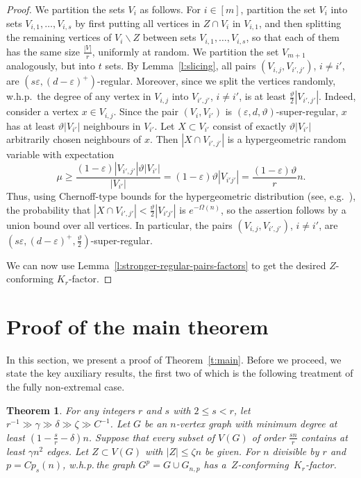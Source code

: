 \documentclass[reqno, 12pt]{amsart}
\numberwithin{equation}{section}
\numberwithin{figure}{section}
\theoremstyle{plain}
\newtheorem{thm}{Theorem}[section]
\theoremstyle{definition}
\let\eps=\varepsilon
\def \Gnp{G_{n,p}}
\let\setminus=\smallsetminus
\begin{document}
    \begin{proof}
        We partition the sets $V_i$ as follows. For $i\in[m]$, partition the set $V_i$ into sets $V_{i,1},\dots,V_{i,s}$ by first putting all vertices in $Z\cap V_i$ in $V_{i,1}$, and then splitting the remaining vertices of $V_i\setminus Z$ between sets $V_{i,1},\dots,V_{i,s}$, so that each of them has the same size $\frac{|V|}{r}$, uniformly at random. We partition the set $V_{m+1}$ analogously, but into $t$ sets. By Lemma~\ref{l:slicing}, all pairs $(V_{i,j}, V_{i',j'})$, $i\neq i
        '$, are $(s\eps,(d-\eps)^+)$-regular. Moreover, since we split the vertices randomly, w.h.p.~the degree of any vertex in $V_{i,j}$ into $V_{i',j'}$, $i\neq i'$, is at least $\frac{\vartheta}{2}|V_{i',j'}|$. Indeed, consider a vertex $x\in V_{i,j}$. Since the pair $(V_i, V_{i'})$ is $(\eps,d,\vartheta)$-super-regular, $x$ has at least $\vartheta|V_{i'}|$ neighbours in $V_{i'}$. Let $X\subset V_{i'}$ consist of exactly $\vartheta|V_{i'}|$ arbitrarily chosen neighbours of $x$. Then $|X\cap V_{i',j'}|$ is a hypergeometric random variable with expectation 
        \[\mu \geq \frac{(1-\eps)|V_{i',j'}|\vartheta|V_{i'}|}{|V_{i'}|} = (1-\eps)\vartheta|V_{i'j'}| = \frac{(1-\eps)\vartheta}{r}n. \]
        Thus, using Chernoff-type bounds for the hypergeometric distribution (see, e.g.~\cite{skala2013hypergeometric}), the probability that $|X\cap V_{i',j'}|<\frac{\vartheta}2|V_{i'j'}|$ is $e^{-\Omega(n)}$, so the assertion follows by a union bound over all vertices. 
        In particular, the pairs $(V_{i,j}, V_{i',j'})$, $i\neq i
        '$, are $\left(s\eps,(d-\eps)^+,\frac{\vartheta}{2}\right)$-super-regular.

        We can now use Lemma~\ref{l:stronger-regular-pairs-factors} to get the desired $Z$-conforming $K_r$-factor.
    \end{proof}


    \section{Proof of the main theorem}
        \label{sec:pf-of-main}

    In this section, we present a proof of Theorem~\ref{t:main}. Before we proceed, we state the key auxiliary results, the first two of which is the following treatment of the fully non-extremal case. 
    
    \begin{thm}
        \label{t:non-extremal-conforming}
        For any integers $r$ and $s$ with $2 \leq s < r$, let $r^{-1} \gg \gamma \gg \delta\gg \zeta \gg C^{-1} $. Let $G$ be an $n$-vertex graph with minimum degree at least $\left(1 - \frac{s}{r} - \delta\right)n$. Suppose that every subset of $V(G)$ of order $\frac{sn}{r}$ contains at least $\gamma n^2 $ edges. Let $Z\subset V(G)$ with $|Z|\leq \zeta n$ be given.  For $n$ divisible by $r$ and $p = Cp_s(n)$, w.h.p.\,the graph $G^p = G \cup \Gnp$ has a~$Z$-conforming~$K_r$-factor.
    \end{thm}
\end{document}
